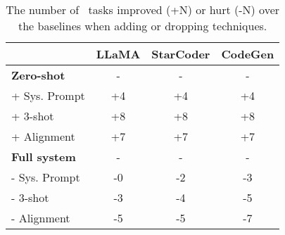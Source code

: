 \begin{wraptable}[14]{r}{6cm}
\vspace{-12pt}
\caption{The number of \snact~tasks improved (+N) or hurt (-N) over the baselines when adding or dropping techniques.}
\label{tab:breakdown}
\begin{adjustbox}{max width=\linewidth}
\setlength{\tabcolsep}{2pt}
\begin{tabular}{@{}lccc@{}}
\toprule
               & LLaMA & StarCoder & CodeGen \\
\midrule
\textbf{Zero-shot} & - & - & -                                                \\
+ Sys. Prompt       & +4 & +4 & +4                                               \\
+ 3-shot & +8 & +8 & +8                                                \\
+ Alignment   & +7 & +7 &+7                                     \\  
\midrule
\textbf{Full system} & - & - & -                                                \\
- Sys. Prompt       & -0 & -2 & -3                                                \\
- 3-shot    & -3 & -4 & -5                                                 \\
- Alignment  & -5 & -5 & -7                                      \\        
\bottomrule
\end{tabular}
\end{adjustbox}
\end{wraptable} 



